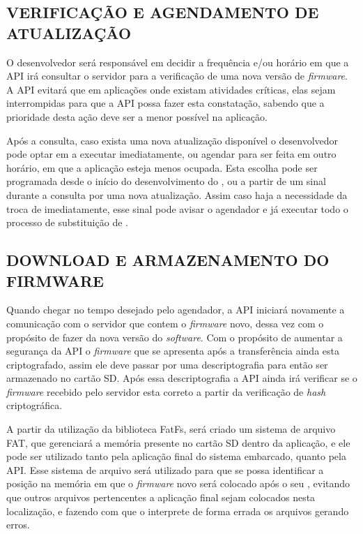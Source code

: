 
\subsection{VERIFICAÇÃO E AGENDAMENTO DE ATUALIZAÇÃO}

O desenvolvedor será responsável em decidir a frequência e/ou horário em que a API irá consultar o servidor para a verificação de uma nova versão de \textit{firmware}. A API evitará que em aplicações onde existam atividades críticas, elas sejam interrompidas para que a API possa fazer esta constatação, sabendo que a prioridade desta ação deve ser a menor possível na aplicação.

Após a consulta, caso exista uma nova atualização disponível o desenvolvedor pode optar em a executar imediatamente, ou agendar para ser feita em outro horário, em que a aplicação esteja menos ocupada. Esta escolha pode ser programada desde o início do desenvolvimento do \firmware, ou a partir de um sinal durante a consulta por uma nova atualização. Assim caso haja a necessidade da troca de \software imediatamente, esse sinal pode avisar o agendador e já executar todo o processo de substituição de \firmware. 

\subsection{DOWNLOAD E ARMAZENAMENTO DO FIRMWARE}

Quando chegar no tempo desejado pelo agendador, a API iniciará novamente a comunicação com o servidor que contem o \textit{firmware} novo, dessa vez com o propósito de fazer \download da nova versão do \textit{software}. Com o propósito de aumentar a segurança da API o \textit{firmware} que se apresenta após a transferência ainda esta criptografado, assim ele deve passar por uma descriptografia para então ser armazenado no cartão SD. Após essa descriptografia a API ainda irá verificar se o \textit{firmware} recebido pelo servidor esta correto a partir da verificação de \textit{hash} criptográfica. 

A partir da utilização da biblioteca FatFs, será criado um sistema de arquivo FAT, que gerenciará a memória presente no cartão SD dentro da aplicação, e ele pode ser utilizado tanto pela aplicação final do sistema embarcado, quanto pela API. Esse sistema de arquivo será utilizado para que se possa identificar a posição na memória em que o \textit{firmware} novo será colocado após o seu \download, evitando que outros arquivos pertencentes a aplicação final sejam colocados nesta localização, e fazendo com que o \bootloader interprete de forma errada os arquivos gerando erros.


